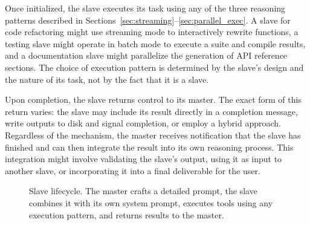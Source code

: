 Once initialized, the slave executes its task using any of the three reasoning patterns described in Sections~\ref{sec:streaming}--\ref{sec:parallel_exec}. A slave for code refactoring might use streaming mode to interactively rewrite functions, a testing slave might operate in batch mode to execute a suite and compile results, and a documentation slave might parallelize the generation of API reference sections. The choice of execution pattern is determined by the slave's design and the nature of its task, not by the fact that it is a slave.

Upon completion, the slave returns control to its master. The exact form of this return varies: the slave may include its result directly in a completion message, write outputs to disk and signal completion, or employ a hybrid approach. Regardless of the mechanism, the master receives notification that the slave has finished and can then integrate the result into its own reasoning process. This integration might involve validating the slave's output, using it as input to another slave, or incorporating it into a final deliverable for the user.

\begin{figure}[t]
\centering
{}
\caption{Slave lifecycle. The master crafts a detailed prompt, the slave combines it with its own system prompt, executes tools using any execution pattern, and returns results to the master.}
\label{fig:subagent_lifecycle}
\end{figure}

